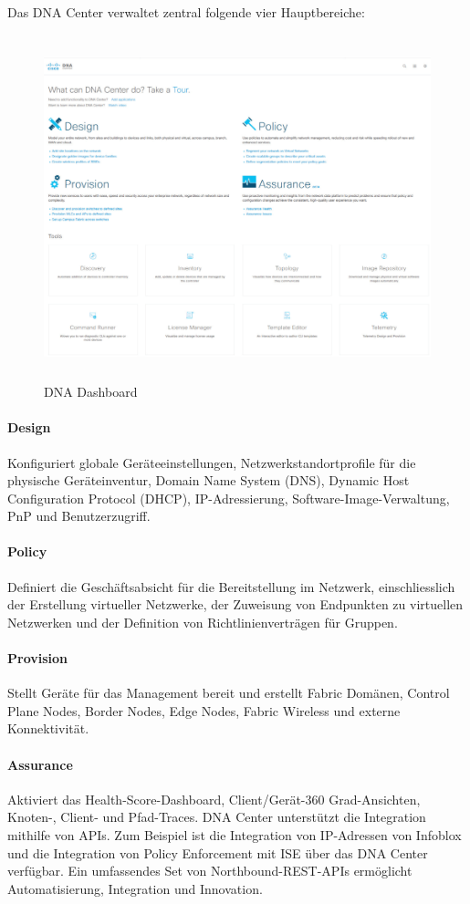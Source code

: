 Das DNA Center verwaltet zentral folgende vier Hauptbereiche: \cite{sda-designguide}

\begin{figure}[H]
	\centering
	\includegraphics[height=10cm]{img/DNA-Dashboard.png}
	\caption{DNA Dashboard}
	\label{fig:DNA Dashboard}
\end{figure}


\paragraph{Design}
Konfiguriert globale Geräteeinstellungen, Netzwerkstandortprofile für die physische Geräteinventur, Domain Name System (DNS), Dynamic Host Configuration Protocol (DHCP), IP-Adressierung, Software-Image-Verwaltung, PnP und Benutzerzugriff.
\paragraph{Policy}
Definiert die Geschäftsabsicht für die Bereitstellung im Netzwerk, einschliesslich der Erstellung virtueller Netzwerke, der Zuweisung von Endpunkten zu virtuellen Netzwerken und der Definition von Richtlinienverträgen für Gruppen.
\paragraph{Provision}
Stellt Geräte für das Management bereit und erstellt Fabric Domänen, Control Plane Nodes, Border Nodes, Edge Nodes, Fabric Wireless und externe Konnektivität.
\paragraph{Assurance}
Aktiviert das Health-Score-Dashboard, Client/Gerät-360 Grad-Ansichten, Knoten-, Client- und Pfad-Traces. DNA Center unterstützt die Integration mithilfe von APIs. Zum Beispiel ist die Integration von IP-Adressen von Infoblox und die Integration von Policy Enforcement mit ISE über das DNA Center verfügbar. Ein umfassendes Set von Northbound-REST-APIs ermöglicht Automatisierung, Integration und Innovation.



